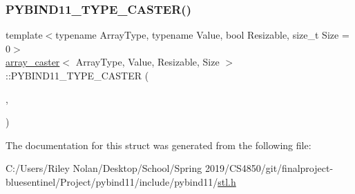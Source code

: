 \subsubsection{\texorpdfstring{PYBIND11\_TYPE\_CASTER()}{PYBIND11\_TYPE\_CASTER()}}
{\footnotesize\ttfamily template$<$typename Array\+Type, typename Value, bool Resizable, size\+\_\+t Size = 0$>$ \\
\mbox{\hyperlink{structarray__caster}{array\+\_\+caster}}$<$ Array\+Type, Value, Resizable, Size $>$\+::P\+Y\+B\+I\+N\+D11\+\_\+\+T\+Y\+P\+E\+\_\+\+C\+A\+S\+T\+ER (\begin{DoxyParamCaption}\item[{Array\+Type}]{,  }\item[{\mbox{\hyperlink{descr_8h_af114703e20c6527e87163eb2798f74b8}{\+\_\+}}(\char`\"{}List\mbox{[}\char`\"{})+value\+\_\+conv\+::name+\mbox{\hyperlink{descr_8h_af114703e20c6527e87163eb2798f74b8}{\+\_\+}}$<$ Resizable $>$(\mbox{\hyperlink{descr_8h_af114703e20c6527e87163eb2798f74b8}{\+\_\+}}(\char`\"{}\char`\"{}), \mbox{\hyperlink{descr_8h_af114703e20c6527e87163eb2798f74b8}{\+\_\+}}(\char`\"{}\mbox{[}\char`\"{})+\mbox{\hyperlink{descr_8h_af114703e20c6527e87163eb2798f74b8}{\+\_\+}}$<$ Size $>$()+\mbox{\hyperlink{descr_8h_af114703e20c6527e87163eb2798f74b8}{\+\_\+}}(\char`\"{}\mbox{]}\char`\"{}))+\mbox{\hyperlink{descr_8h_af114703e20c6527e87163eb2798f74b8}{\+\_\+}}(\char`\"{}\mbox{]}\char`\"{})}]{ }\end{DoxyParamCaption})}



The documentation for this struct was generated from the following file\+:\begin{DoxyCompactItemize}
\item 
C\+:/\+Users/\+Riley Nolan/\+Desktop/\+School/\+Spring 2019/\+C\+S4850/git/finalproject-\/bluesentinel/\+Project/pybind11/include/pybind11/\mbox{\hyperlink{stl_8h}{stl.\+h}}\end{DoxyCompactItemize}
